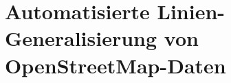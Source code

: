 \documentclass{../thesis}
\begin{document}


\section{Automatisierte Linien-Generalisierung von OpenStreetMap-Daten}
\end{document}
